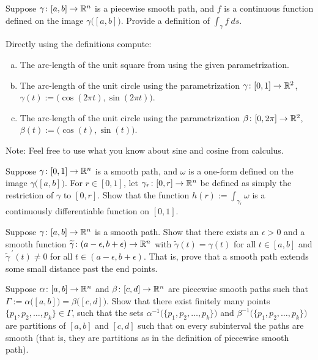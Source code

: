 \begin{exercise}
Suppose $\gamma \colon [a,b] \to {\mathbb{R}}^n$ is a piecewise smooth path, and $f$ is a
continuous function defined on the image $\gamma\bigl([a,b]\bigr)$.
Provide a definition of $\int_{\gamma} f ~ds$.
\end{exercise}

\begin{exercise}
Directly using the definitions compute:
\begin{enumerate}[a)]
\item
The arc-length of the unit square from
 using the given parametrization.
\item
The arc-length of the unit circle using the parametrization
$\gamma \colon [0,1] \to {\mathbb{R}}^2$, $\gamma(t) := \bigl(\cos(2\pi t),\sin(2\pi t)\bigr)$.
\item
The arc-length of the unit circle using the parametrization
$\beta \colon [0,2\pi] \to {\mathbb{R}}^2$, $\beta(t) := \bigl(\cos(t),\sin(t)\bigr)$.
\end{enumerate}
Note: Feel free to use what you know about sine and cosine from calculus.
\end{exercise}

\begin{exercise}
Suppose $\gamma \colon [0,1] \to {\mathbb{R}}^n$ is a smooth path, and
$\omega$ is a one-form defined on the image $\gamma\bigl([a,b]\bigr)$.
For $r \in [0,1]$, let $\gamma_r \colon [0,r] \to {\mathbb{R}}^n$ be defined
as simply the restriction of $\gamma$ to $[0,r]$.  Show that the
function $h(r) := \int_{\gamma_r} \omega$ is a continuously
differentiable function on $[0,1]$.
\end{exercise}

\begin{exercise}
Suppose $\gamma \colon [a,b] \to {\mathbb{R}}^n$ is a smooth path.
Show that there exists an $\epsilon > 0$ and a smooth function
$\widetilde{\gamma} \colon (a-\epsilon,b+\epsilon) \to {\mathbb{R}}^n$
with $\widetilde{\gamma}(t) = \gamma(t)$ for all $t \in [a,b]$
and $\widetilde{\gamma}^{\:\prime}(t) \not= 0$ for all $t \in 
(a-\epsilon,b+\epsilon)$.  That is, prove that a smooth path extends
some small distance past the end points.
\end{exercise}

\begin{exercise} 
Suppose $\alpha \colon [a,b] \to {\mathbb{R}}^n$ and
$\beta \colon [c,d] \to {\mathbb{R}}^n$ are piecewise smooth paths such that
$\Gamma := \alpha\bigl([a,b]\bigr) = \beta\bigl([c,d]\bigr)$.
Show that there exist finitely many points
$\{ p_1,p_2,\ldots,p_k\} \in \Gamma$, such that
the sets
$\alpha^{-1}\bigl( \{ p_1,p_2,\ldots,p_k\} \bigr)$
and
$\beta^{-1}\bigl( \{ p_1,p_2,\ldots,p_k\} \bigr)$
are partitions of $[a,b]$ and $[c,d]$ such that on every subinterval
the paths are smooth (that is, they are partitions as in the definition
of piecewise smooth path).
\end{exercise}

